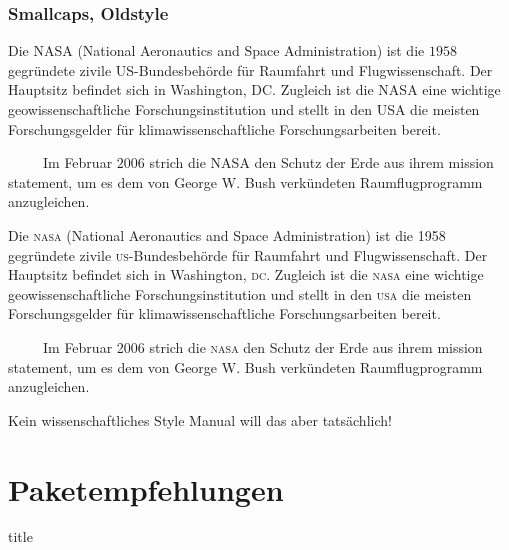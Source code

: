 \documentclass{beamer}
\makeatletter
\newcommand\sectiontitlepage{
    \miniframesoff
    \begin{frame}
        \vfill
        \centering
        \begin{beamercolorbox}[sep=8pt,center,shadow=true,rounded=true]{title}
            \usebeamerfont{title}\insertsectionhead\par%
        \end{beamercolorbox}
        \vfill
    \end{frame}
    \miniframeson
}
\let\beamer@writeslidentry@miniframeson=\beamer@writeslidentry
\def\beamer@writeslidentry@miniframesoff{%
    \expandafter\beamer@ifempty\expandafter{\beamer@framestartpage}{}%
    {%
        \clearpage\beamer@notesactions%
    }
}
\newcommand*{\miniframeson}{\let\beamer@writeslidentry=\beamer@writeslidentry@miniframeson}
\newcommand*{\miniframesoff}{\let\beamer@writeslidentry=\beamer@writeslidentry@miniframesoff}
\makeatother
\begin{document}
\begin{frame}[fragile]
    \frametitle{Smallcaps, Oldstyle}%
    \vspace*{-2.5ex}
    \begin{multicols}{2}
        \small\justifying
        Die NASA (National Aeronautics and Space Administration) ist die $1958$ gegründete zivile US-Bundesbehörde für Raumfahrt und Flugwissenschaft.
        Der Hauptsitz befindet sich in Washington, DC.
        Zugleich ist die NASA eine wichtige geowissenschaftliche Forschungsinstitution und stellt in den USA die meisten Forschungsgelder für klimawissenschaftliche Forschungsarbeiten bereit.

        ~~~~~Im Februar $2006$ strich die NASA den Schutz der Erde aus ihrem mission statement, um es dem von George W. Bush verkündeten Raumflugprogramm anzugleichen.

        Die \textsc{nasa} (National Aeronautics and Space Administration) ist die 1958 gegründete zivile \textsc{us}-Bundesbehörde für Raumfahrt und Flugwissenschaft.
        Der Hauptsitz befindet sich in Washington, \textsc{dc}.
        Zugleich ist die \textsc{nasa} eine wichtige geowissenschaftliche Forschungsinstitution und stellt in den \textsc{usa} die meisten Forschungsgelder für klimawissenschaftliche Forschungsarbeiten bereit.

        ~~~~~Im Februar 2006 strich die \textsc{nasa} den Schutz der Erde aus ihrem mission statement, um es dem von George W. Bush verkündeten Raumflugprogramm anzugleichen.
    \end{multicols}
    \pause
    Kein wissenschaftliches Style Manual will das aber tatsächlich!
\end{frame}

\section{Paketempfehlungen}

\sectiontitlepage
\end{document}
